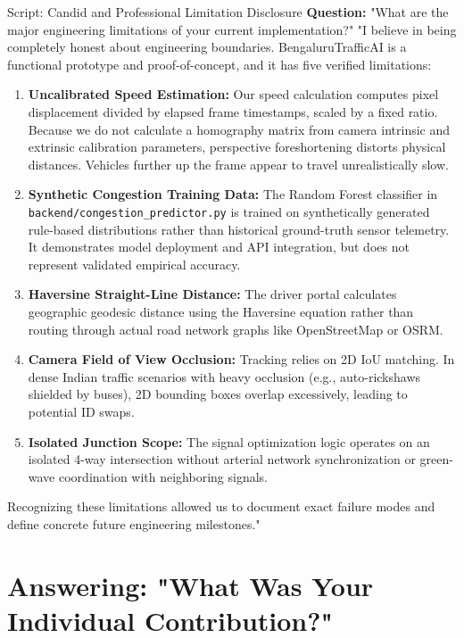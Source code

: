 \documentclass[11pt,a4paper,oneside]{report}
\begin{document}
\begin{interviewq}{Script: Candid and Professional Limitation Disclosure}
\textbf{Question:} "What are the major engineering limitations of your current implementation?"
\tcblower
"I believe in being completely honest about engineering boundaries. BengaluruTrafficAI is a functional prototype and proof-of-concept, and it has five verified limitations:

\begin{enumerate}
    \item \textbf{Uncalibrated Speed Estimation:} Our speed calculation computes pixel displacement divided by elapsed frame timestamps, scaled by a fixed ratio. Because we do not calculate a homography matrix from camera intrinsic and extrinsic calibration parameters, perspective foreshortening distorts physical distances. Vehicles further up the frame appear to travel unrealistically slow.
    \item \textbf{Synthetic Congestion Training Data:} The Random Forest classifier in \texttt{backend/congestion\_predictor.py} is trained on synthetically generated rule-based distributions rather than historical ground-truth sensor telemetry. It demonstrates model deployment and API integration, but does not represent validated empirical accuracy.
    \item \textbf{Haversine Straight-Line Distance:} The driver portal calculates geographic geodesic distance using the Haversine equation rather than routing through actual road network graphs like OpenStreetMap or OSRM.
    \item \textbf{Camera Field of View Occlusion:} Tracking relies on 2D IoU matching. In dense Indian traffic scenarios with heavy occlusion (e.g., auto-rickshaws shielded by buses), 2D bounding boxes overlap excessively, leading to potential ID swaps.
    \item \textbf{Isolated Junction Scope:} The signal optimization logic operates on an isolated 4-way intersection without arterial network synchronization or green-wave coordination with neighboring signals.
\end{enumerate}
Recognizing these limitations allowed us to document exact failure modes and define concrete future engineering milestones."
\end{interviewq}

\section{Answering: "What Was Your Individual Contribution?"}
\label{sec:script_contribution}
\end{document}
